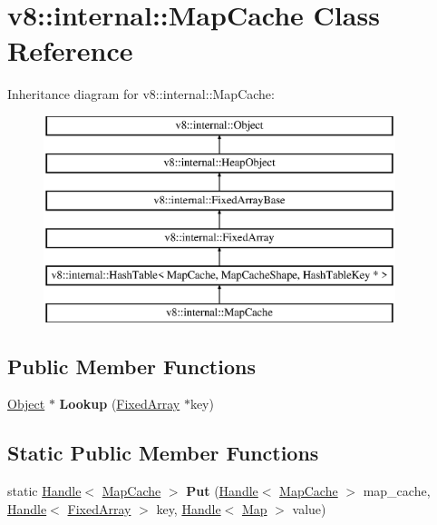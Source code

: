 \hypertarget{classv8_1_1internal_1_1_map_cache}{}\section{v8\+:\+:internal\+:\+:Map\+Cache Class Reference}
\label{classv8_1_1internal_1_1_map_cache}
Inheritance diagram for v8\+:\+:internal\+:\+:Map\+Cache\+:\begin{figure}[H]
\begin{center}
\leavevmode
\includegraphics[height=6.000000cm]{classv8_1_1internal_1_1_map_cache}
\end{center}
\end{figure}
\subsection*{Public Member Functions}
\begin{DoxyCompactItemize}
\item 
\hypertarget{classv8_1_1internal_1_1_map_cache_a74a5f0eb4ba20945c6ac6e3b16cabd52}{}\hyperlink{classv8_1_1internal_1_1_object}{Object} $\ast$ {\bfseries Lookup} (\hyperlink{classv8_1_1internal_1_1_fixed_array}{Fixed\+Array} $\ast$key)\label{classv8_1_1internal_1_1_map_cache_a74a5f0eb4ba20945c6ac6e3b16cabd52}

\end{DoxyCompactItemize}
\subsection*{Static Public Member Functions}
\begin{DoxyCompactItemize}
\item 
\hypertarget{classv8_1_1internal_1_1_map_cache_ae36c09012aea288bb054777bffb9b8c7}{}static \hyperlink{classv8_1_1internal_1_1_handle}{Handle}$<$ \hyperlink{classv8_1_1internal_1_1_map_cache}{Map\+Cache} $>$ {\bfseries Put} (\hyperlink{classv8_1_1internal_1_1_handle}{Handle}$<$ \hyperlink{classv8_1_1internal_1_1_map_cache}{Map\+Cache} $>$ map\+\_\+cache, \hyperlink{classv8_1_1internal_1_1_handle}{Handle}$<$ \hyperlink{classv8_1_1internal_1_1_fixed_array}{Fixed\+Array} $>$ key, \hyperlink{classv8_1_1internal_1_1_handle}{Handle}$<$ \hyperlink{classv8_1_1internal_1_1_map}{Map} $>$ value)\label{classv8_1_1internal_1_1_map_cache_ae36c09012aea288bb054777bffb9b8c7}

\end{DoxyCompactItemize}
